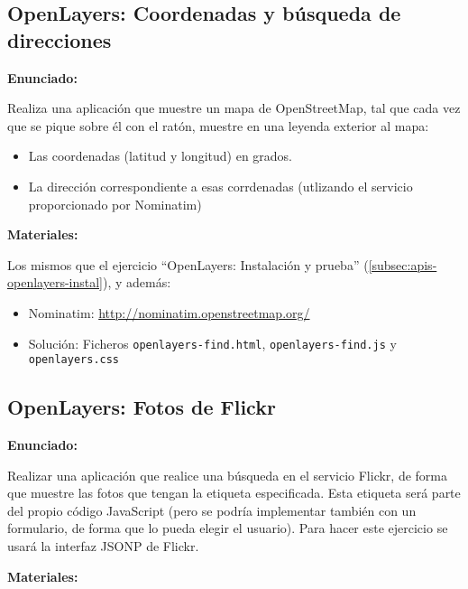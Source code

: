 \subsection{OpenLayers: Coordenadas y búsqueda de direcciones}
\label{subsec:apis-openlayers-coordenadas}

\textbf{Enunciado:}

Realiza una aplicación que muestre un mapa de OpenStreetMap, tal que cada vez que se pique sobre él con el ratón, muestre en una leyenda exterior al mapa:

\begin{itemize}
\item Las coordenadas (latitud y longitud) en grados.
\item La dirección correspondiente a esas corrdenadas (utlizando el servicio proporcionado por Nominatim)
\end{itemize}

\textbf{Materiales:}

Los mismos que el ejercicio ``OpenLayers: Instalación y prueba'' (\ref{subsec:apis-openlayers-instal}), y además:

\begin{itemize}
\item Nominatim: \url{http://nominatim.openstreetmap.org/}
\item Solución: Ficheros \verb|openlayers-find.html|, \verb|openlayers-find.js| y \verb|openlayers.css|
\end{itemize}

\subsection{OpenLayers: Fotos de Flickr}
\label{subsec:apis-flickr}

\textbf{Enunciado:}

Realizar una aplicación que realice una búsqueda en el servicio Flickr, de forma que muestre las fotos que tengan la etiqueta especificada. Esta etiqueta será parte del propio código JavaScript (pero se podría implementar también con un formulario, de forma que lo pueda elegir el usuario). Para hacer este ejercicio se usará la interfaz JSONP de Flickr.

\textbf{Materiales:}

